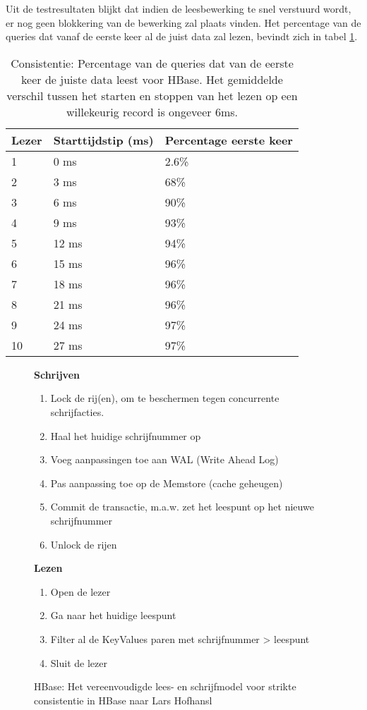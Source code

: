 Uit de testresultaten blijkt dat indien de leesbewerking te snel verstuurd wordt, er nog geen blokkering van de bewerking zal plaats vinden. Het percentage van de queries dat vanaf de eerste keer al de juist data zal lezen, bevindt zich in tabel \ref{table:consistentie-hbase-correct}.

\begin{table}
\centering
\begin{tabular}{l| l l}
	\textbf{Lezer} & \textbf{Starttijdstip (ms)} & \textbf{Percentage eerste keer} \\
	\hline
	1 &  0 ms & 2.6\%\\
	2 &  3 ms & 68\%\\
	3 &  6 ms & 90\%\\
	4 &  9 ms & 93\%\\
	5 &  12 ms & 94\%\\
	6 &  15 ms & 96\%\\
	7 &  18 ms & 96\%\\
	8 &  21 ms & 96\%\\
	9 &  24 ms & 97\%\\
	10 & 27 ms & 97\% 
\end{tabular}
\caption{Consistentie: Percentage van de queries dat van de eerste keer de juiste data leest voor HBase. Het gemiddelde verschil tussen het starten en stoppen van het lezen op een willekeurig record is ongeveer 6ms. }
\label{table:consistentie-hbase-correct}
\end{table}

\begin{figure}[tb!]
	\begin{minipage}{0.5\textwidth} 
	\textbf{Schrijven}
	\begin{enumerate}
	\item Lock de rij(en), om te beschermen tegen concurrente schrijfacties. 
	\item Haal het huidige schrijfnummer op
	\item Voeg aanpassingen toe aan WAL (Write Ahead Log)
	\item Pas aanpassing toe op de Memstore (cache geheugen)
	\item Commit de transactie, m.a.w. zet het leespunt op het nieuwe schrijfnummer
	\item Unlock de rijen
	\end{enumerate}
	\end{minipage} \hfill
	\begin{minipage}{0.3\textwidth} 
	\textbf{Lezen}
	\begin{enumerate}
	\item Open de lezer
	\item Ga naar het huidige leespunt
	\item Filter al de KeyValues paren met schrijfnummer > leespunt
	\item Sluit de lezer
	\end{enumerate}
	\end{minipage}
	\caption{HBase: Het vereenvoudigde lees- en schrijfmodel voor strikte consistentie in HBase naar Lars Hofhansl\cite{hbase-acid}}\label{fig:consistency-hbase-uitleg}
\end{figure}

